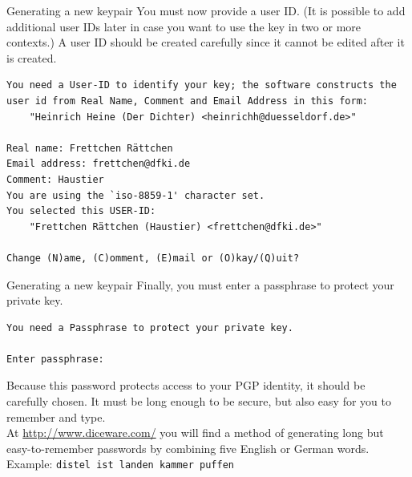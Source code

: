 \documentclass[%
mode=present,%
paper=screen%
]{powerdot}
\begin{document}
\begin{slide}[method=direct,toc=]{Generating a new keypair}
  You must now provide a user ID.  (It is possible to add additional
  user IDs later in case you want to use the key in two or more
  contexts.) A user ID should be created carefully since it cannot be
  edited after it is created.\\[1ex]
\begin{verbatim}
You need a User-ID to identify your key; the software constructs the
user id from Real Name, Comment and Email Address in this form:
    "Heinrich Heine (Der Dichter) <heinrichh@duesseldorf.de>"

Real name: Frettchen Rättchen
Email address: frettchen@dfki.de
Comment: Haustier
You are using the `iso-8859-1' character set.
You selected this USER-ID:
    "Frettchen Rättchen (Haustier) <frettchen@dfki.de>"

Change (N)ame, (C)omment, (E)mail or (O)kay/(Q)uit?
\end{verbatim}
\end{slide}

\begin{slide}[method=direct,toc=]{Generating a new keypair}
Finally, you must enter a passphrase to protect your private key.\\[1ex]
\begin{verbatim}
You need a Passphrase to protect your private key.    

Enter passphrase: 

\end{verbatim}
Because this password protects access to your PGP identity, it should
be carefully chosen.  It must be long enough to be secure, but also
easy for you to remember and type.\\[1ex]

At \url{http://www.diceware.com/} you will find a method of generating
long but easy-to-remember passwords by combining five English or
German words.\\[1ex]

Example: \texttt{distel ist landen kammer puffen}
\end{slide}
\end{document}
